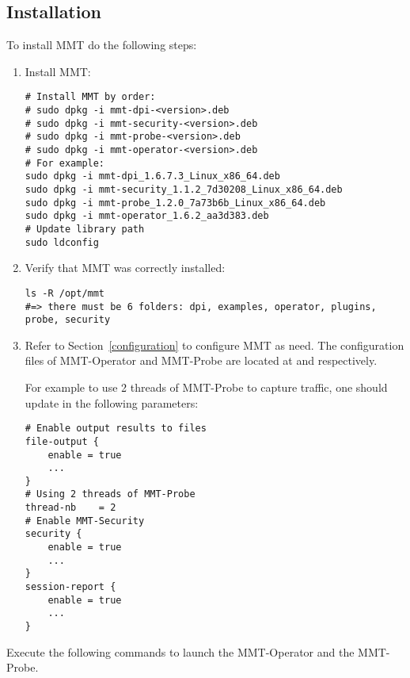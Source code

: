 \subsection{Installation}

To install MMT do the following steps:

\begin{enumerate}

\item Install MMT:

\begin{lstlisting}[style=BASH]
# Install MMT by order:
# sudo dpkg -i mmt-dpi-<version>.deb
# sudo dpkg -i mmt-security-<version>.deb
# sudo dpkg -i mmt-probe-<version>.deb
# sudo dpkg -i mmt-operator-<version>.deb
# For example:
sudo dpkg -i mmt-dpi_1.6.7.3_Linux_x86_64.deb
sudo dpkg -i mmt-security_1.1.2_7d30208_Linux_x86_64.deb
sudo dpkg -i mmt-probe_1.2.0_7a73b6b_Linux_x86_64.deb
sudo dpkg -i mmt-operator_1.6.2_aa3d383.deb
# Update library path
sudo ldconfig
\end{lstlisting}

\item Verify that MMT was correctly installed:

\begin{lstlisting}[style=BASH]
ls -R /opt/mmt
#=> there must be 6 folders: dpi, examples, operator, plugins, probe, security
\end{lstlisting}

\item Refer to Section~\ref{configuration} to configure MMT as need. 
The configuration files of MMT-Operator and MMT-Probe are located at  and  respectively. 

For example to use 2 threads of MMT-Probe to capture traffic, 
one should update in  the following parameters:


\begin{lstlisting}[style=CONFIG]
# Enable output results to files
file-output {
    enable = true
    ...
}
# Using 2 threads of MMT-Probe
thread-nb    = 2
# Enable MMT-Security
security {
    enable = true
    ...
}
session-report { 
    enable = true
    ...
}
\end{lstlisting}

\end{enumerate}

Execute the following commands to launch the MMT-Operator and the MMT-Probe.


